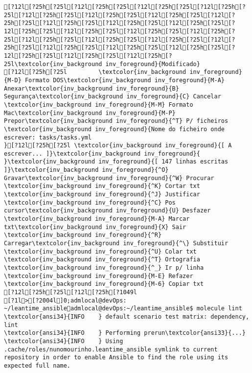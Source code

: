 \documentclass{scrartcl}
\begin{document}
\begin{Verbatim}
[?12l[?25h[?25l[?12l[?25h[?25l[?12l[?25h[?25l[?12l[?25h[?25l[?12l[?25h[?25l[?12l[?25h[?25l[?12l[?25h[?25l[?12l[?25h[?25l[?12l[?25h[?25l[?12l[?25h[?25l[?12l[?25h[?25l[?12l[?25h[?25l[?12l[?25h[?25l[?12l[?25h[?25l[?12l[?25h[?25l[?12l[?25h[?25l[?12l[?25h[?25l[?12l[?25h[?25l[?12l[?25h[?25l[?12l[?25h[?25l[?12l[?25h[?25l[?12l[?25h[?25l[?12l[?25h[?25l[?12l[?25h[?25l[?12l[?25h[?25l\textcolor{inv_background inv_foreground}{Modificado}
[?12l[?25h[?25l         \textcolor{inv_background inv_foreground}{M-D} Formato DOS\textcolor{inv_background inv_foreground}{M-A} Anexar\textcolor{inv_background inv_foreground}{B} Segurança\textcolor{inv_background inv_foreground}{C} Cancelar           \textcolor{inv_background inv_foreground}{M-M} Formato Mac\textcolor{inv_background inv_foreground}{M-P} Prepor\textcolor{inv_background inv_foreground}{^T} P/ ficheiros
\textcolor{inv_background inv_foreground}{Nome do ficheiro onde escrever: tasks/tasks.yml                                                                                           }[?12l[?25h[?25l \textcolor{inv_background inv_foreground}{[ A escrever... ]}\textcolor{inv_background inv_foreground}{          }\textcolor{inv_background inv_foreground}{[ 147 linhas escritas ]}\textcolor{inv_background inv_foreground}{^O} Gravar\textcolor{inv_background inv_foreground}{^W} Procurar      \textcolor{inv_background inv_foreground}{^K} Cortar txt    \textcolor{inv_background inv_foreground}{^J} Justificar    \textcolor{inv_background inv_foreground}{^C} Pos cursor\textcolor{inv_background inv_foreground}{U} Desfazer     \textcolor{inv_background inv_foreground}{M-A} Marcar txt\textcolor{inv_background inv_foreground}{X} Sair    \textcolor{inv_background inv_foreground}{^R} Carregar\textcolor{inv_background inv_foreground}{^\} Substituir    \textcolor{inv_background inv_foreground}{^U} Colar txt     \textcolor{inv_background inv_foreground}{^T} Ortografia    \textcolor{inv_background inv_foreground}{^_} Ir p/ linha   \textcolor{inv_background inv_foreground}{M-E} Refazer      \textcolor{inv_background inv_foreground}{M-6} Copiar txt
[?12l[?25h[?25l[?12l[?25h[?1049l
[?1l>[?2004l]0;admlocal@devOps: ~/leantime_ansibleadmlocal@devOps:~/leantime_ansible$ molecule lint
\textcolor{ansi34}{INFO    } default scenario test matrix: dependency, lint
\textcolor{ansi34}{INFO    } Performing prerun\textcolor{ansi33}{...}
\textcolor{ansi34}{INFO    } Using .cache/roles/nunomourinho.leantime_ansible symlink to current repository in order to enable Ansible to find the role using its expected full name.

\end{Verbatim}
\end{document}
